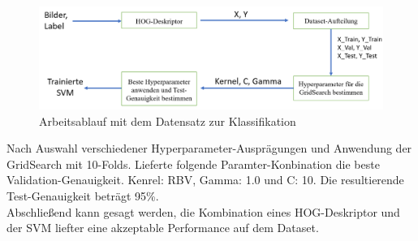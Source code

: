 \begin{figure}[h]
\centering
\includegraphics[scale=0.5]{./bilder/workflow.png}
\caption{Arbeitsablauf mit dem Datensatz zur Klassifikation}
\end{figure}

Nach Auswahl verschiedener Hyperparameter-Ausprägungen und Anwendung der GridSearch mit 10-Folds. Lieferte folgende Paramter-Konbination die beste Validation-Genauigkeit.
Kenrel: RBV, Gamma: 1.0 und C: 10.
Die resultierende Test-Genauigkeit beträgt 95\%.\\

Abschließend kann gesagt werden, die Kombination eines HOG-Deskriptor und der SVM liefter eine akzeptable Performance auf dem Dataset.